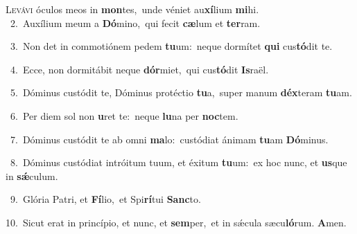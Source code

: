\lettrine{\initial\textcolor{\initialcolor}{L}}{evávi} óculos meos in \textbf{mon}\-tes,~\star unde véniet au\-\textbf{xí}\-lium \textbf{mi}\-hi.\\
{\numbfont\textcolor{\numbcolor}{~2.}}~Auxílium meum a \textbf{Dó}\-mino,~\star qui fecit \textbf{cæ}\-lum et \textbf{ter}\-ram.\par
{\numbfont\textcolor{\numbcolor}{~3.}}~Non det in commotiónem pedem \textbf{tu}\-um:~\star neque dormítet \textbf{qui} cus\-\textbf{tó}\-dit te.\par
{\numbfont\textcolor{\numbcolor}{~4.}}~Ecce, non dormitábit neque \textbf{dór}\-miet,~\star qui cus\-\textbf{tó}\-dit \textbf{Is}\-raël.\par
{\numbfont\textcolor{\numbcolor}{~5.}}~Dóminus custódit te, Dóminus protéctio \textbf{tu}\-a,~\star super manum \textbf{déx}\-teram \textbf{tu}\-am.\par
{\numbfont\textcolor{\numbcolor}{~6.}}~Per diem sol non \textbf{u}\-ret te:~\star neque \textbf{lu}\-na per \textbf{noc}\-tem.\par
{\numbfont\textcolor{\numbcolor}{~7.}}~Dóminus custódit te ab omni \textbf{ma}\-lo:~\star custódiat ánimam \textbf{tu}\-am \textbf{Dó}\-minus.\par
{\numbfont\textcolor{\numbcolor}{~8.}}~Dóminus custódiat intróitum tuum, et éxitum \textbf{tu}\-um:~\star ex hoc nunc, et \textbf{us}\-que in \textbf{sǽ}\-culum.\par
{\numbfont\textcolor{\numbcolor}{~9.}}~Glória Patri, et \textbf{Fí}\-lio,~\star et Spi\-\textbf{rí}\-tui \textbf{Sanc}\-to.\par
{\numbfont\textcolor{\numbcolor}{10.}}~Sicut erat in princípio, et nunc, et \textbf{sem}\-per,~\star et in sǽcula sæcu\-\textbf{ló}\-rum. \textbf{A}\-men.\par
